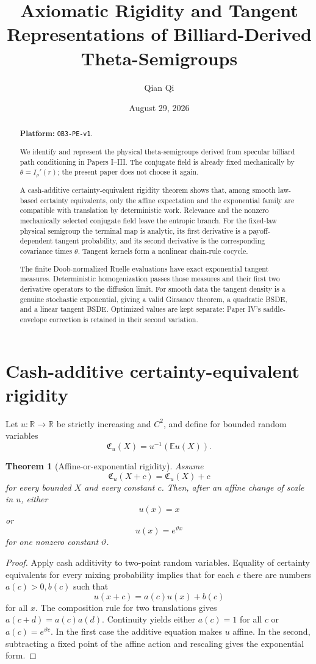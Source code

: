 \documentclass[11pt,reqno]{amsart}
\title[Rigidity and tangent representations]{Axiomatic Rigidity and Tangent Representations of Billiard-Derived Theta-Semigroups}
\author{Qian Qi}
\date{August 29, 2026}
\newtheorem{theorem}{Theorem}[section]
\theoremstyle{definition}
\theoremstyle{remark}
\newcommand{\E}{\mathbb E}
\newcommand{\R}{\mathbb R}
\begin{document}
\raggedbottom
\begin{abstract}
\noindent\textbf{Platform: }\texttt{OB3-PE-v1}.\par
We identify and represent the physical theta-semigroups derived from specular
billiard path conditioning in Papers I--III.  The conjugate field is already
fixed mechanically by $\theta=I_\rho'(r)$; the present paper does not choose it
again.

A cash-additive certainty-equivalent rigidity theorem shows that, among smooth
law-based certainty equivalents, only the affine expectation and the
exponential family are compatible with translation by deterministic work.
Relevance and the nonzero mechanically selected conjugate field leave the
entropic branch.  For the fixed-law physical semigroup the terminal map is
analytic, its first derivative is a payoff-dependent tangent probability, and
its second derivative is the corresponding covariance times $\theta$.
Tangent kernels form a nonlinear chain-rule cocycle.

The finite Doob-normalized Ruelle evaluations have exact exponential tangent
measures.  Deterministic homogenization passes those measures and their first
two derivative operators to the diffusion limit.  For smooth data the tangent
density is a genuine stochastic exponential, giving a valid Girsanov theorem,
a quadratic BSDE, and a linear tangent BSDE.  Optimized values are kept
separate: Paper IV's saddle-envelope correction is retained in their second
variation.
\end{abstract}
\maketitle
\tableofcontents

\section{Cash-additive certainty-equivalent rigidity}\label{sec:rigidity}
Let $u:\R\to\R$ be strictly increasing and $C^2$, and define for bounded
random variables
\[
 \mathfrak C_u(X)=u^{-1}(\E u(X)).
\]

\begin{theorem}[Affine-or-exponential rigidity]\label{thm:utility-rigidity}
Assume
\[
 \mathfrak C_u(X+c)=\mathfrak C_u(X)+c
\]
for every bounded $X$ and every constant $c$.  Then, after an affine change of
scale in $u$, either
\[
 u(x)=x
\]
or
\[
 u(x)=e^{\vartheta x}
\]
for one nonzero constant $\vartheta$.
\end{theorem}
\begin{proof}
Apply cash additivity to two-point random variables.  Equality of certainty
equivalents for every mixing probability implies that for each $c$ there are
numbers $a(c)>0,b(c)$ such that
\[
 u(x+c)=a(c)u(x)+b(c)
\]
for all $x$.  The composition rule for two translations gives
$a(c+d)=a(c)a(d)$.  Continuity yields either $a(c)=1$ for all $c$ or
$a(c)=e^{\vartheta c}$.  In the first case the additive equation makes $u$
affine.  In the second, subtracting a fixed point of the affine action and
rescaling gives the exponential form.
\end{proof}
\end{document}
